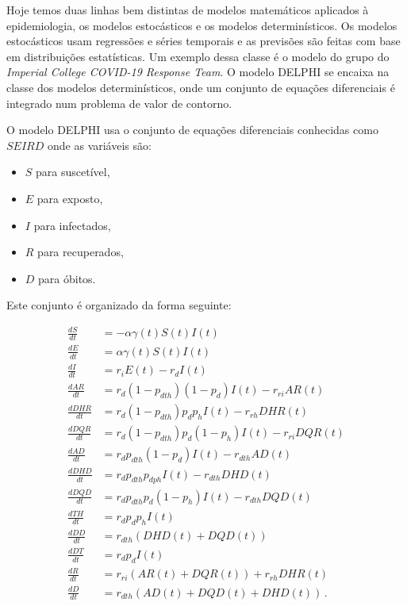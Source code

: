 \documentclass[12pt]{article}
\begin{document}
Hoje temos duas linhas bem distintas de modelos matemáticos aplicados à epidemiologia, os modelos estocásticos e os modelos determinísticos. Os modelos estocásticos usam regressões e séries temporais e as previsões são feitas com base em distribuições estatísticas. Um exemplo dessa classe é o modelo do grupo do \textit{Imperial College COVID-19 Response Team}\cite{impirial1}. O modelo DELPHI\cite{delphi} se encaixa na classe dos modelos determinísticos, onde um conjunto de equações diferenciais é integrado num problema de valor de contorno\cite{2008elementary}. 

O modelo DELPHI usa o conjunto de equações diferenciais conhecidas como \(SEIRD\) onde as variáveis  são:

\begin{itemize}
  \item \(S\) para suscetível,
  \item \(E\) para exposto,
  \item \(I\) para infectados,
  \item \(R\) para recuperados,
  \item \(D\) para óbitos.
  \end{itemize}

Este conjunto é organizado da forma seguinte:

  \begin{align*}
    \frac{dS}{dt} & = - \alpha \gamma(t) S(t) I(t) \\
    \frac{dE}{dt} & = \alpha \gamma(t) S(t) I(t) \\
    \frac{dI}{dt} & = r_i E(t) - r_d I(t) \\
    \frac{d AR}{dt} & = r_d(1 - p_{dth})(1 - p_d) I(t) - r_{ri} AR(t) \\
    \frac{d DHR}{dt} & =  r_d (1 - p_{dth}) p_d p_h I(t) - r_{rh} DHR(t) \\
    \frac{d DQR}{dt} & = r_d (1 - p_{dth}) p_d (1 - p_h) I(t) - r_{ri} DQR(t) \\
    \frac{d AD}{dt} & =  r_d p_{dth} (1 - p_d) I(t) - r_{dth} AD(t) \\
    \frac{d DHD}{dt} & =  r_d p_{dth} p_{dph} I(t) - r_{dth} DHD(t) \\
    \frac{d DQD}{dt} & =  r_d p_{dth} p_d(1 - p_h) I(t) - r_{dth} DQD(t) \\
    \frac{d TH}{dt} & = r_d p_d p_h I(t)  \\
    \frac{d DD}{dt} & =  r_{dth} (DHD(t) + DQD(t)) \\
    \frac{d DT}{dt} & = r_d  p_d I(t) \\
    \frac{d R}{dt} & =  r_{ri} (AR(t) + DQR(t)) + r_{rh} DHR(t) \\
    \frac{d D}{dt} & =  r_{dth} (AD(t) + DQD(t) + DHD(t)) \, .
   \end{align*}
\end{document}
